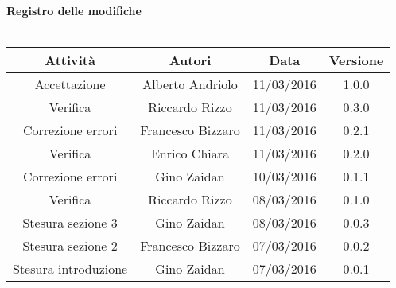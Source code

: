 \vspace{1cm}
   {\fontsize{15pt}{16pt}\selectfont \textbf{Registro delle modifiche}}\\ \\

\bgroup
\def\arraystretch{1.6}
\begin{tabular}{| c | c | c | c |}
\hline
\textbf{Attività} & \textbf{Autori} & \textbf{Data} & \textbf{Versione}\\ \hline \hline


Accettazione & Alberto Andriolo & 11/03/2016 & 1.0.0 \\ \hline  

Verifica & Riccardo Rizzo & 11/03/2016 & 0.3.0 \\ \hline  

Correzione errori & Francesco Bizzaro & 11/03/2016 & 0.2.1 \\ \hline

Verifica & Enrico Chiara & 11/03/2016 & 0.2.0 \\ \hline  

Correzione errori & Gino Zaidan & 10/03/2016 & 0.1.1 \\ \hline  

Verifica & Riccardo Rizzo & 08/03/2016 & 0.1.0 \\ \hline  

Stesura sezione 3 & Gino Zaidan & 08/03/2016 & 0.0.3 \\ \hline

Stesura sezione 2 & Francesco Bizzaro & 07/03/2016 & 0.0.2 \\ \hline

Stesura introduzione & Gino Zaidan & 07/03/2016 & 0.0.1 \\ \hline 


\end{tabular}
\egroup
\newpage